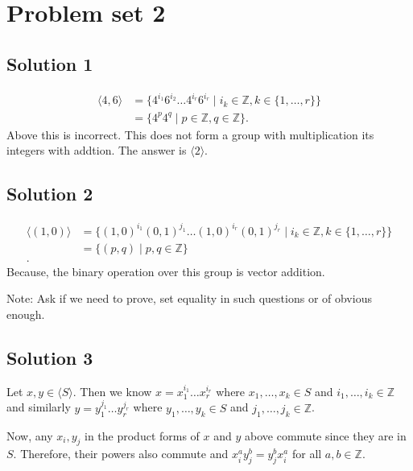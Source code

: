 \section{Problem set 2}      

\subsection{Solution 1}

\begin{align*}
  \langle 4,6 \rangle &= \{4^{i_{1}}6^{i_{2}} \ldots 4^{i_{r}}6^{i_{r}} \mid i_{k} \in \mathbb{Z}, k \in \{1,\ldots,r\}   \}   \\
&= \{4^{p}4^{q} \mid p \in \mathbb{Z}, q \in \mathbb{Z}\} 
.\end{align*}
Above this is incorrect. This does not form a group with multiplication its integers with addtion.
The answer is \( \langle 2 \rangle \).

\subsection{Solution 2}
\begin{align*}
  \langle \left( 1,0 \right) \rangle &= \{\left( 1,0 \right)^{i_{1}}\left( 0,1 \right)^{j_{1}} \ldots \left( 1,0 \right)^{i_{r}}\left( 0,1 \right)^{j_{r}} \mid i_{k} \in \mathbb{Z}, k \in \{1,\ldots,r\} \}    \\
                                     &= \{\left( p,q \right) \mid p,q \in \mathbb{Z}\} \\
.\end{align*}
Because, the binary operation over this group is vector addition.

Note: Ask if we need to prove, set equality in such questions or of obvious enough.
\subsection{Solution 3}
Let \( x, y \in \langle S \rangle \). Then we know \( x = x_{1}^{i_{1}}\ldots x_{r}^{i_{r}} \) where \( x_{1}, \ldots, x_{k} \in S\) and \( i_{1},\ldots,i_{k} \in \mathbb{Z}\) and
similarly \( y = y_{1}^{j_{1}}\ldots y_{r}^{j_{r}} \) where \( y_{1}, \ldots, y_{k} \in S\) and \( j_{1},\ldots,j_{k} \in \mathbb{Z}\).

Now, any \( x_{i}, y_{j}\) in the product forms of \( x  \) and \( y \) above commute since they are in \( S \).
Therefore, their powers also commute and \( x_{i}^{a} y_{j}^{b} =  y_{j}^{b} x_{i}^{a}\) for all \( a,b  \in \mathbb{Z}\).

